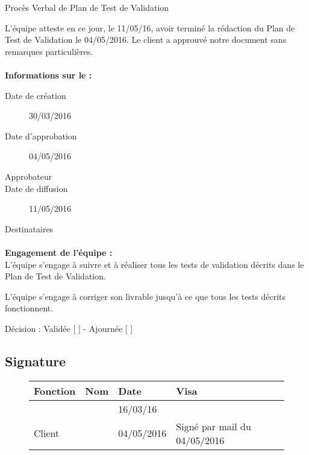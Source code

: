 \documentclass[asi, sansVersion]{picInsa}
\begin{document}
 
 \begin{center}
  \LARGE{}
    Procès Verbal de Plan de Test de Validation\\
 \end{center}
 
 \normalsize{}
 
L'équipe \nomEquipe{} atteste en ce jour, le 11/05/16, avoir terminé la rédaction du Plan de Test de Validation le 04/05/2016.
Le client a approuvé notre document sans remarques particulières.


\paragraph{}
\textbf{Informations sur le \PTVCourt :}

\begin{description}
  \item[Date de création]30/03/2016
  \item[Date d'approbation]04/05/2016
  \item[Approbateur]\nomClient
  \item[Date de diffusion]11/05/2016
  \item[Destinataires]\nomEquipe
\end{description}

\paragraph{}
\textbf{Engagement de l'équipe :}\\


L'équipe \nomEquipe{} s'engage à suivre et à réaliser tous les tests de validation décrits dans le Plan de Test de Validation.


L'équipe \nomEquipe{} s'engage à corriger son livrable jusqu'à ce que tous les tests décrits fonctionnent.


\begin{center}
Décision : Validée [ \checkmark{} ] - Ajournée [ ]
\end{center}

\subsection*{Signature}
\begin{figure}[H]
		\centering
		\begin{tabularx}{17cm}{|p{4cm}|X|X|X|X|}
		\hline
		\rowcolor[gray]{0.85} Fonction & Nom & Date & Visa \\
		\hline
		\CP{} & \Sergi{} & 16/03/16 & \\
		\hline
		Client & \nomClient & 04/05/2016 & Signé par mail du 04/05/2016\\
		\hline
		\end{tabularx}
\end{figure}
\end{document}

